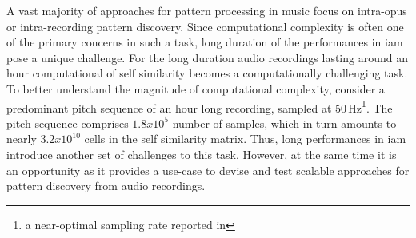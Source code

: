 
A vast majority of approaches for pattern processing in music focus on intra-opus or intra-recording pattern discovery. Since computational complexity is often one of the primary concerns in such a task, long duration of the performances in \gls{iam} pose a unique challenge. For the long duration audio recordings lasting around an hour computational of self similarity becomes a computationally challenging task. To better understand the magnitude of computational complexity, consider a predominant pitch sequence of an hour long recording, sampled at 50\,Hz\footnote{a near-optimal sampling rate reported in }. The pitch sequence comprises $1.8x10^{5}$ number of samples, which in turn amounts to nearly $3.2x10^{10}$ cells in the self similarity matrix.  Thus, long performances in \gls{iam} introduce another set of challenges to this task. However, at the same time it is an opportunity as it provides a use-case to devise and test scalable approaches for pattern discovery from audio recordings. 





